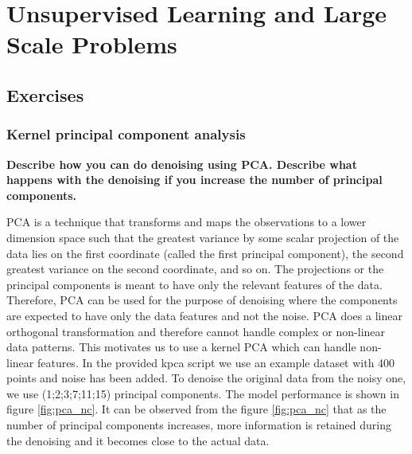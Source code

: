 \chapter{Unsupervised Learning and Large Scale Problems}
\section{Exercises}
\subsection{Kernel principal component analysis}
\textbf{Describe how you can do denoising using PCA. Describe what happens with the denoising if you increase the number of principal components.}

PCA is a technique that transforms and maps the observations to a lower dimension space such that the greatest variance by some scalar projection of the data lies on the first coordinate (called the first principal component), the second greatest variance on the second coordinate, and so on. The projections or the principal components is meant to have only the relevant features of the data. Therefore, PCA can be used for the purpose of denoising where the components are expected to have only the data features and not the noise. PCA does a linear orthogonal transformation and therefore cannot handle complex or non-linear data patterns. This motivates us to  use a kernel PCA which can handle non-linear features. In the provided kpca script we use an example dataset with 400 points and noise has been added. To denoise the original data from the noisy one, we use (1;2;3;7;11;15) principal components. The model performance is shown in figure \ref{fig:pca_nc}. It can be observed from the figure \ref{fig:pca_nc} that as the number of principal components increases, more information is retained during the denoising and it becomes close to the actual data.
